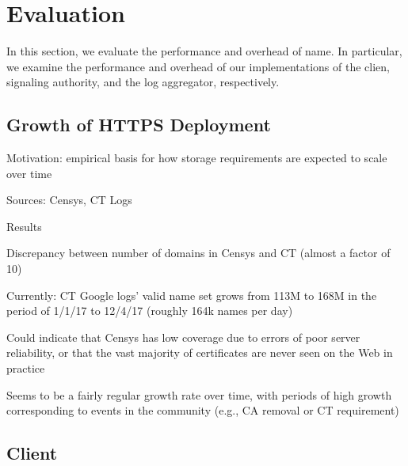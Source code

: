 \section{Evaluation}
\label{sec:evaluation}

In this section, we evaluate the performance and overhead of \ac{name}. In
particular, we examine the performance and overhead of our implementations of
the clien, signaling authority, and the log aggregator, respectively.

\subsection{Growth of HTTPS Deployment}

\begin{compactitem}
\item Motivation: empirical basis for how storage requirements are expected to
  scale over time
\item Sources: Censys, CT Logs
\item Results
  \begin{compactitem}
  \item Discrepancy between number of domains in Censys and CT (almost a factor
    of 10)
    \begin{compactitem}
    \item Currently: CT Google logs' valid name set grows from 113M to 168M in
      the period of 1/1/17 to 12/4/17 (roughly 164k names per day)
    \item Could indicate that Censys has low coverage due to errors of poor
      server reliability, or that the vast majority of certificates are never
      seen on the Web in practice
    \end{compactitem}
  \item Seems to be a fairly regular growth rate over time, with periods of high
    growth corresponding to events in the community (e.g., CA removal or CT
    requirement)
  \item {}
  \item {}
  \item {}
  \end{compactitem}
\end{compactitem}

\subsection{Client}

